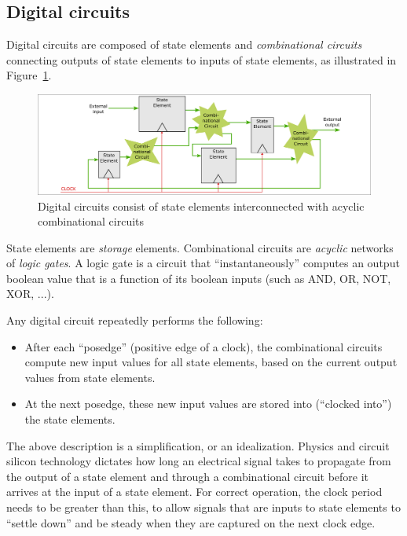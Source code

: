 
\subsection{Digital circuits}


Digital circuits are composed of state elements and
\emph{combinational circuits} connecting outputs of state elements to
inputs of state elements, as illustrated in
Figure~\ref{Fig_BSV_Digital_Circuits}.
\begin{figure}[htbp]
  \centerline{\includegraphics[width=6in,angle=0]{Figures/Fig_BSV_Digital_Circuits}}
  \caption{\label{Fig_BSV_Digital_Circuits}
           Digital circuits consist of state elements interconnected
	   with acyclic combinational circuits}
\end{figure}

State elements are \emph{storage} elements.  Combinational circuits
are \emph{acyclic} networks of \emph{logic gates}.  A logic gate is a
circuit that ``instantaneously'' computes an output boolean value that
is a function of its boolean inputs (such as AND, OR, NOT, XOR, ...).

Any digital circuit repeatedly performs the following:

\begin{itemize}

\item After each ``posedge'' (positive edge of a clock), the
      combinational circuits compute new input values for all state
      elements, based on the current output values from state elements.

\item At the next posedge, these new input values are stored into
      (``clocked into'') the state elements.

\end{itemize}

The above description is a simplification, or an idealization.
Physics and circuit silicon technology dictates how long an electrical
signal takes to propagate from the output of a state element and
through a combinational circuit before it arrives at the input of a
state element.  For correct operation, the clock period needs to be
greater than this, to allow signals that are inputs to state elements
to ``settle down'' and be steady when they are captured on the next
clock edge.


